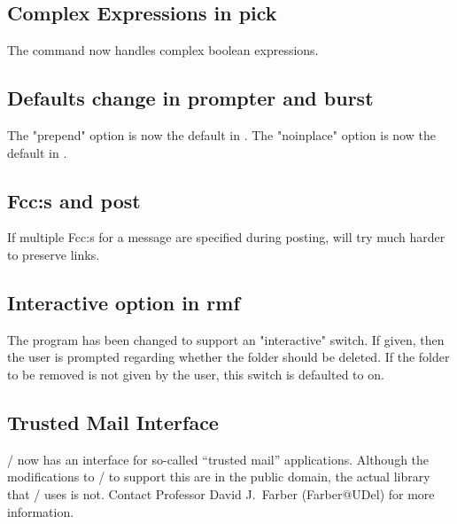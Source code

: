 \subsection*	{Complex Expressions in pick}
The  command now handles complex boolean expressions.

\subsection*	{Defaults change in prompter and burst}
The \switch"prepend" option is now the default in .
The \switch"noinplace" option is now the default in .

\subsection*	{Fcc:s and post}
If multiple Fcc:s for a message are specified during posting,
 will try much harder to preserve links.

\subsection*	{Interactive option in rmf}
The  program has been changed to support an \switch"interactive"
switch.
If given,
then the user is prompted regarding whether the folder should be deleted.
If the folder to be removed is not given by the user,
this switch is defaulted to on.

\subsection*	{Trusted Mail Interface}
\MH/ now has an interface for so-called ``trusted mail'' applications.
Although the modifications to \MH/ to support this are in the public domain,
the actual library that \MH/ uses is not.
Contact Professor David J.~Farber ({\sf Farber@UDel\/}) for more information.




\showsummary


